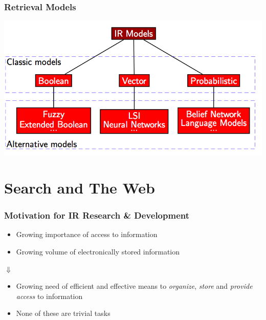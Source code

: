 \documentclass[svgnames]{beamer}
\begin{document}

\begin{frame}
    \frametitle{Retrieval Models}

    \begin{center}
        \includegraphics[width=.8\linewidth]{retrieval-models.png}\\
    \end{center}

\end{frame}



\section{Search and The Web}


\begin{frame}
    \frametitle{Motivation for IR Research \& Development}

    \begin{block}{}
        \begin{itemize}
        \item Growing importance of access to information
        \item Growing volume of electronically stored information
        \end{itemize}
    \end{block}

    \begin{center}
        {\Huge $\Downarrow$}
    \end{center}

    \begin{block}{}
        \begin{itemize}
        \item Growing need of efficient and effective means to \emph{organize},
            \emph{store} and \emph{provide access} to information
        \item None of these are trivial tasks
        \end{itemize}
    \end{block}
\end{frame}
\end{document}
